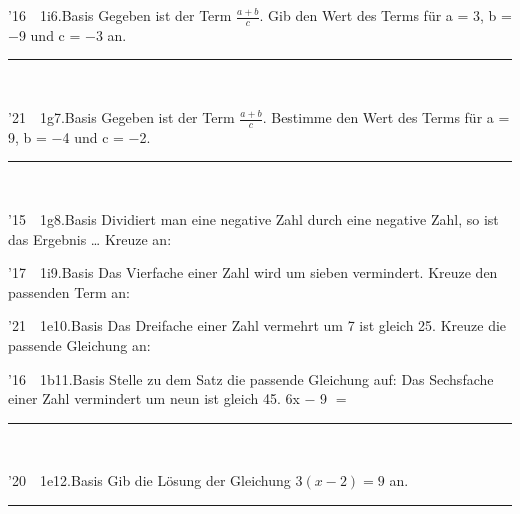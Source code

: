 \documentclass[11pt]{article}
\def\gkopfnach{}
\newcommand{\gkopfvor}[1]{\gdef\gkopfnach{#1}}
\newcommand{\linie}[1]{\,{\color{black!45}\rule[-1pt]{#1}{0.4pt}}\,}
\newcommand{\pkt}{\textperiodcentered{}}
\begin{document}
\gkopfvor{\gbstvor{D}\pfstufekopf{Ältere Prüfungsaufgaben}{}}
\begin{pfaufg}{’16~\pkt{}~1i}{6.}{Basis}
Gegeben ist der Term $\tfrac{a+b}{c}$. Gib den Wert des Terms für a = 3, b = $-$9 und c = $-$3 an.
\hfill\linie{30mm}
\end{pfaufg}
\begin{pfaufg}{’21~\pkt{}~1g}{7.}{Basis}
Gegeben ist der Term $\tfrac{a+b}{c}$. Bestimme den Wert des Terms für a = 9, b = $-$4 und c = $-$2.
\hfill\linie{30mm}
\end{pfaufg}
\begin{pfaufg}{’15~\pkt{}~1g}{8.}{Basis}
Dividiert man eine negative Zahl durch eine negative Zahl, so ist das Ergebnis … Kreuze an:
\par\smallskip\noindent{}
\end{pfaufg}
\begin{pfaufg}{’17~\pkt{}~1i}{9.}{Basis}
Das Vierfache einer Zahl wird um sieben vermindert. Kreuze den passenden Term an:
\par\smallskip\noindent{}
\end{pfaufg}
\begin{pfaufg}{’21~\pkt{}~1e}{10.}{Basis}
Das Dreifache einer Zahl vermehrt um 7 ist gleich 25. Kreuze die passende Gleichung an:
\par\smallskip\noindent{}
\end{pfaufg}
\begin{pfaufg}{’16~\pkt{}~1b}{11.}{Basis}
Stelle zu dem Satz die passende Gleichung auf: Das Sechsfache einer Zahl vermindert um neun ist gleich 45.
\hfill 6x $-$ 9 $=$\linie{30mm}
\end{pfaufg}
\begin{pfaufg}{’20~\pkt{}~1e}{12.}{Basis}
Gib die Lösung der Gleichung $3(x  -  2) = 9$ an.
\hfill\linie{30mm}
\end{pfaufg}
\end{document}
